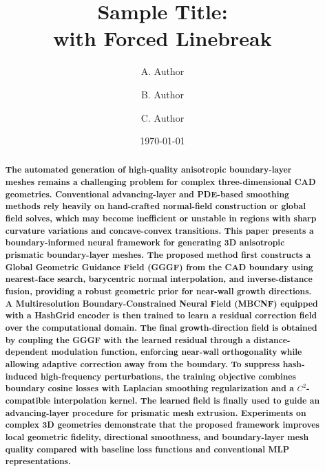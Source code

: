 \documentclass[%
 aip,
 amsmath,amssymb,
 reprint,%
nobibnotes,
]{revtex4-1}
\begin{document}

\title[Sample title]{Sample Title:\\with Forced Linebreak}
\author{A. Author}
\author{B. Author}%
%

\author{C. Author}
%

\date{\today}%

\begin{abstract}
\textbf{The automated generation of high-quality anisotropic boundary-layer meshes remains a challenging problem for complex three-dimensional CAD geometries. Conventional advancing-layer and PDE-based smoothing methods rely heavily on hand-crafted normal-field construction or global field solves, which may become inefficient or unstable in regions with sharp curvature variations and concave-convex transitions. This paper presents a boundary-informed neural framework for generating 3D anisotropic prismatic boundary-layer meshes. The proposed method first constructs a Global Geometric Guidance Field (GGGF) from the CAD boundary using nearest-face search, barycentric normal interpolation, and inverse-distance fusion, providing a robust geometric prior for near-wall growth directions. A Multiresolution Boundary-Constrained Neural Field (MBCNF) equipped with a HashGrid encoder is then trained to learn a residual correction field over the computational domain. The final growth-direction field is obtained by coupling the GGGF with the learned residual through a distance-dependent modulation function, enforcing near-wall orthogonality while allowing adaptive correction away from the boundary. To suppress hash-induced high-frequency perturbations, the training objective combines boundary cosine losses with Laplacian smoothing regularization and a $C^2$-compatible interpolation kernel. The learned field is finally used to guide an advancing-layer procedure for prismatic mesh extrusion. Experiments on complex 3D geometries demonstrate that the proposed framework improves local geometric fidelity, directional smoothness, and boundary-layer mesh quality compared with baseline loss functions and conventional MLP representations.}
\end{abstract}
\end{document}
